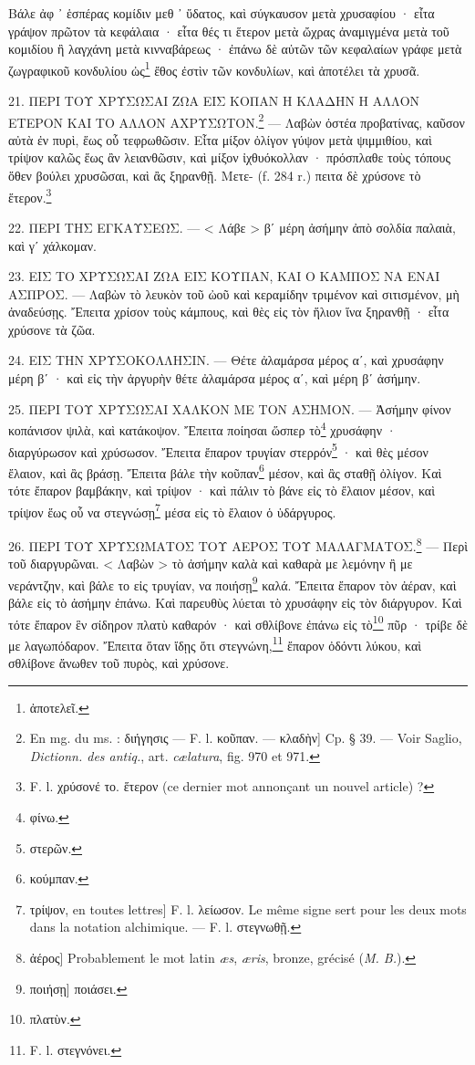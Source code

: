 \documentclass[a4paper, 11pt, oneside, polutonikogreek, french]{article}
\begin{document}
Βάλε ἀφ ᾽ ἑσπέρας κομίδιν μεθ ᾽ ὕδατος, καὶ σύγκαυσον μετὰ χρυσαφίου · εἶτα γράψον πρῶτον τὰ κεφάλαια · εἶτα θές τι ἕτερον μετὰ ὤχρας ἀναμιγμένα μετὰ τοῦ κομιδίου ἢ λαγχάνη μετὰ κινναβάρεως · ἐπάνω δὲ αὐτῶν τῶν κεφαλαίων γράφε μετὰ ζωγραφικοῦ κονδυλίου ὠς\footnote{ἀποτελεῖ.} ἔθος ἐστὶν τῶν κονδυλίων, καὶ ἀποτέλει τὰ χρυσᾶ.

21. ΠΕΡΙ ΤΟΥ ΧΡΥΣΩΣΑΙ ΖΩΑ ΕΙΣ ΚΟΠΑΝ Η ΚΛΑΔΗΝ Η ΑΛΛΟΝ ΕΤΕΡΟΝ ΚΑΙ ΤΟ ΑΛΛΟΝ ΑΧΡΥΣΩΤΟΝ.\footnote{En mg. du ms. : διήγησις --- F. l. κοῦπαν. --- κλαδὴν] Cp. § 39. --- Voir Saglio, \emph{Dictionn. des antiq.}, art. \emph{cælatura}, fig. 970 et 971.} --- Λαβὼν ὀστέα προβατίνας, καῦσον αὐτὰ ἐν πυρὶ, ἕως οὗ τεφρωθῶσιν. Εἶτα μίξον ὀλίγον γύψον μετὰ ψιμμιθίου, καὶ τρίψον καλῶς ἕως ἂν λειανθῶσιν, καὶ μίξον ἰχθυόκολλαν · πρόσπλαθε τοὺς τόπους ὅθεν βούλει χρυσῶσαι, καὶ ἂς ξηρανθῇ. Μετε- (f. 284 r.) πειτα δὲ χρύσονε τὸ ἕτερον.\footnote{F. l. χρύσονέ το. ἕτερον (ce dernier mot annonçant un nouvel article) ?}

22. ΠΕΡΙ ΤΗΣ ΕΓΚΑΥΣΕΩΣ. --- < Λάβε > βʹ μέρη ἀσήμην ἀπὸ σολδία παλαιὰ, καὶ γʹ χάλκομαν.

23. ΕΙΣ ΤΟ ΧΡΥΣΩΣΑΙ ΖΩΑ ΕΙΣ ΚΟΥΠΑΝ, ΚΑΙ Ο ΚΑΜΠΟΣ ΝΑ ΕΝΑΙ ΑΣΠΡΟΣ. --- Λαβὼν τὸ λευκὸν τοῦ ὠοῦ καὶ κεραμίδην τριμένον καὶ σιτισμένον, μὴ ἀναδεύσῃς. Ἔπειτα χρίσον τοὺς κάμπους, καὶ θὲς εἰς τὸν ἥλιον ἵνα ξηρανθῇ · εἶτα χρύσονε τὰ ζῶα.

24. ΕΙΣ ΤΗΝ ΧΡΥΣΟΚΟΛΛΗΣΙΝ. --- Θέτε ἀλαμάρσα μέρος αʹ, καὶ χρυσάφην μέρη βʹ · καὶ εἰς τὴν ἀργυρὴν θέτε ἀλαμάρσα μέρος αʹ, καὶ μέρη βʹ ἀσήμην.

25. ΠΕΡΙ ΤΟΥ ΧΡΥΣΩΣΑΙ ΧΑΛΚΟΝ ΜΕ ΤΟΝ ΑΣΗΜΟΝ. --- Ἀσήμην φίνον κοπάνισον ψιλὰ, καὶ κατάκοψον. Ἔπειτα ποίησαι ὥσπερ τὸ\footnote{φίνω.} χρυσάφην · διαργύρωσον καὶ χρύσωσον. Ἔπειτα ἔπαρον τρυγίαν στερρόν\footnote{στερῶν.} · καὶ θὲς μέσον ἔλαιον, καὶ ἂς βράσῃ. Ἔπειτα βάλε τὴν κοῦπαν\footnote{κούμπαν.} μέσον, καὶ ἂς σταθῇ ὀλίγον. Καὶ τότε ἔπαρον βαμβάκην, καὶ τρίψον · καὶ πάλιν τὸ βάνε εἰς τὸ ἔλαιον μέσον, καὶ τρίψον ἕως οὗ να στεγνώσῃ\footnote{τρίψον, en toutes lettres] F. l. λείωσον. Le même signe sert pour les deux mots dans la notation alchimique. --- F. l. στεγνωθῇ.} μέσα εἰς τὸ ἔλαιον ὁ ὑδάργυρος.

26. ΠΕΡΙ ΤΟΥ ΧΡΥΣΩΜΑΤΟΣ ΤΟΥ ΑΕΡΟΣ ΤΟΥ ΜΑΛΑΓΜΑΤΟΣ.\footnote{ἀέρος] Probablement le mot latin \emph{æs}, \emph{æris}, bronze, grécisé (\emph{M. B.}).} --- Περὶ τοῦ διαργυρῶναι. < Λαβὼν > τὸ ἀσήμην καλὰ καὶ καθαρὰ με λεμόνην ἢ με νεράντζην, καὶ βάλε το εἰς τρυγίαν, να ποιήσῃ\footnote{ποιήσῃ] ποιάσει.} καλά. Ἔπειτα ἔπαρον τὸν ἀέραν, καὶ βάλε εἰς τὸ ἀσήμην ἐπάνω. Καὶ παρευθὺς λύεται τὸ χρυσάφην εἰς τὸν διάργυρον. Καὶ τότε ἔπαρον ἓν σίδηρον πλατὺ καθαρόν · καὶ σθλίβονε ἐπάνω εἰς τὸ\footnote{πλατὺν.} πῦρ · τρίβε δὲ με λαγωπόδαρον. Ἔπειτα ὅταν ἴδῃς ὅτι στεγνώνη,\footnote{F. l. στεγνόνει.} ἔπαρον ὀδόντι λύκου, καὶ σθλίβονε ἄνωθεν τοῦ πυρὸς, καὶ χρύσονε.
\end{document}
